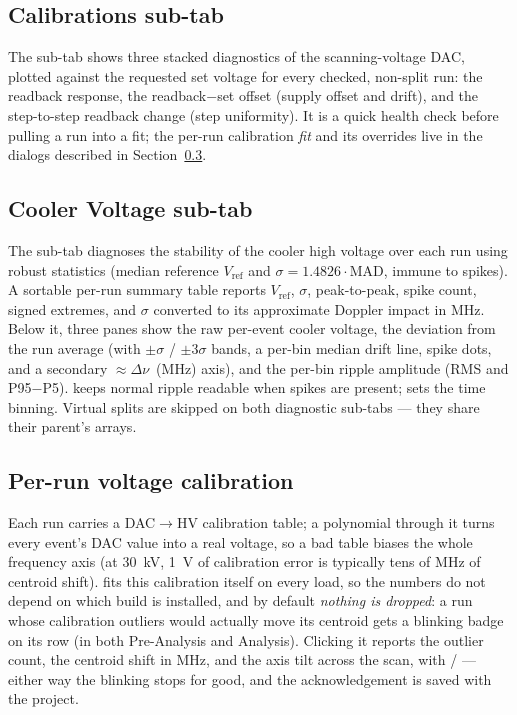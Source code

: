\subsection{Calibrations sub-tab}

The  sub-tab shows three stacked diagnostics of the
scanning-voltage DAC, plotted against the requested set voltage for
every checked, non-split run: the readback response, the
readback$-$set offset (supply offset and drift), and the
step-to-step readback change (step uniformity). It is a quick health
check before pulling a run into a fit; the per-run calibration
\emph{fit} and its overrides live in the dialogs described in
Section~\ref{sec:pa_calibration}.

\subsection{Cooler Voltage sub-tab}

The  sub-tab diagnoses the stability of the
cooler high voltage over each run using robust statistics (median
reference $V_{\mathrm{ref}}$ and $\sigma = 1.4826\cdot$MAD, immune to
spikes). A sortable per-run summary table reports
$V_{\mathrm{ref}}$, $\sigma$, peak-to-peak, spike count, signed
extremes, and $\sigma$ converted to its approximate Doppler impact in
MHz. Below it, three panes show the raw per-event cooler voltage,
the deviation from the run average (with $\pm\sigma$ / $\pm3\sigma$
bands, a per-bin median drift line, spike dots, and a secondary
$\approx\Delta\nu$~(MHz) axis), and the per-bin ripple amplitude
(RMS and P95$-$P5).  keeps normal ripple
readable when spikes are present;  sets the time binning.
Virtual splits are skipped on both diagnostic sub-tabs --- they share
their parent's arrays.

\subsection{Per-run voltage calibration}
\label{sec:pa_calibration}

Each run carries a DAC$\rightarrow$HV calibration table; a polynomial
through it turns every event's DAC value into a real voltage, so a
bad table biases the whole frequency axis (at 30~kV, 1~V of
calibration error is typically tens of MHz of centroid shift). \denis{}
fits this calibration itself on every load, so the numbers do not
depend on which  build is installed, and by default
\emph{nothing is dropped}: a run whose calibration outliers would
actually move its centroid gets a blinking \app{!} badge on its row
(in both Pre-Analysis and Analysis). Clicking it reports the outlier
count, the centroid shift in MHz, and the axis tilt across the scan,
with  /  --- either way
the blinking stops for good, and the acknowledgement is saved with
the project.

